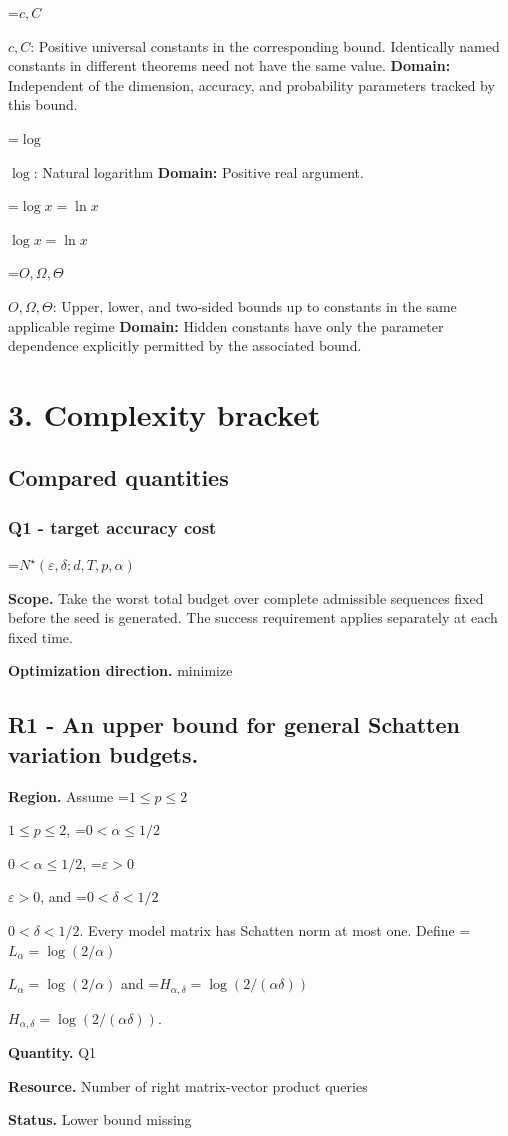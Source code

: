 \documentclass[10pt,a4paper]{article}
\newcommand{\AtlasMath}[1]{\par\begingroup\centering\setbox0=\hbox{$\displaystyle #1$}\ifdim\wd0>1.4\linewidth\typeout{ATLAS WIDE FORMULA: \the\wd0}\fi\ifdim\wd0>\linewidth\resizebox{\linewidth}{!}{\box0}\else\box0\fi\par\endgroup}
\newcommand{\AtlasInlineMath}[1]{\begingroup\setbox0=\hbox{$#1$}\ifdim\wd0>.4\linewidth\endgroup\AtlasMath{#1}\else\endgroup$#1$\fi}
\begin{document}
\AtlasInlineMath{c,C}: Positive universal constants in the corresponding bound. Identically named constants in different theorems need not have the same value. \textbf{Domain:} Independent of the dimension, accuracy, and probability parameters tracked by this bound.

\AtlasInlineMath{\log}: Natural logarithm \textbf{Domain:} Positive real argument.

\AtlasInlineMath{\log x=\ln x}

\AtlasInlineMath{O,\Omega,\Theta}: Upper, lower, and two-sided bounds up to constants in the same applicable regime \textbf{Domain:} Hidden constants have only the parameter dependence explicitly permitted by the associated bound.

\section{3. Complexity bracket}
\subsection{Compared quantities}
\subsubsection{Q1 - target accuracy cost}
\AtlasMath{N^\star(\varepsilon,\delta;d,T,p,\alpha)}
\textbf{Scope.} Take the worst total budget over complete admissible sequences fixed before the seed is generated. The success requirement applies separately at each fixed time.

\textbf{Optimization direction.} minimize

\subsection{R1 - An upper bound for general Schatten variation budgets.}
\textbf{Region.} Assume \AtlasInlineMath{1\le p\le2}, \AtlasInlineMath{0<\alpha\le1/2}, \AtlasInlineMath{\varepsilon>0}, and \AtlasInlineMath{0<\delta<1/2}. Every model matrix has Schatten norm at most one. Define \AtlasInlineMath{L_\alpha=\log(2/\alpha)} and \AtlasInlineMath{H_{\alpha,\delta}=\log(2/(\alpha\delta))}.

\textbf{Quantity.} Q1

\textbf{Resource.} Number of right matrix-vector product queries

\textbf{Status.} Lower bound missing
\end{document}
